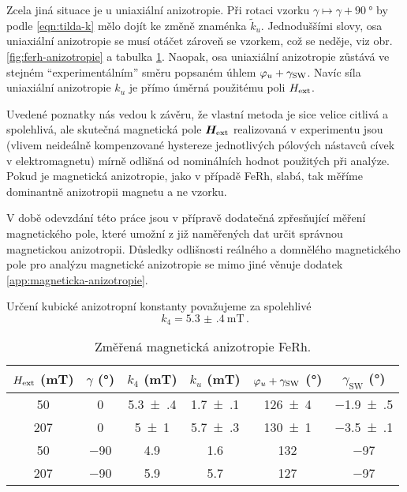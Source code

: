 Zcela jiná situace je u uniaxiální anizotropie.
Při rotaci vzorku $\gamma \mapsto\gamma+\SI{90}{\degree}$ by podle \eqref{eqn:tilda-k} mělo dojít ke změně znaménka $\tilde{k}_u$.
Jednoduššími slovy, osa uniaxiální anizotropie se musí otáčet zároveň se vzorkem, což se neděje, viz obr. \ref{fig:ferh-anizotropie} a tabulka \ref{tab:ferh-anizotropie}.
Naopak, osa uniaxiální anizotropie zůstává ve stejném ``experimentálním'' směru popsaném úhlem $\varphi_u+\gamma_\textrm{SW}$.
Navíc síla uniaxiální anizotropie $k_u$ je přímo úměrná použitému poli $H_\textrm{ext}$.

Uvedené poznatky nás vedou k závěru, že vlastní metoda je sice velice citlivá a spolehlivá, ale skutečná magnetická pole $\bm{H}_\textrm{ext}$ realizovaná v experimentu jsou (vlivem neideálně kompenzované hystereze jednotlivých pólových nástavců cívek v elektromagnetu) mírně odlišná od nominálních hodnot použitých při analýze.
Pokud je magnetická anizotropie, jako v případě FeRh, slabá, tak měříme dominantně anizotropii magnetu a ne vzorku.

V době odevzdání této práce jsou v přípravě dodatečná zpřesňující měření magnetického pole, které umožní z již naměřených dat určit správnou magnetickou anizotropii.
Důsledky odlišnosti reálného a domnělého magnetického pole pro analýzu magnetické anizotropie se mimo jiné věnuje dodatek \ref{app:magneticka-anizotropie}.

Určení kubické anizotropní konstanty považujeme za spolehlivé
\begin{equation}
    k_4=\SI{5.3(4)}{\milli\tesla} \,.
\end{equation}

\begin{table}[tp]
    \centering
    \begin{tabular}{cc|cccc}
        \toprule
        $H_\textrm{ext}$ (\si{\milli\tesla}) & $\gamma$ (\si{\degree}) & $k_4$ (\si{\milli\tesla}) & $k_u$ (\si{\milli\tesla}) & $\varphi_u+\gamma_\textrm{SW}$ (\si{\degree}) & $\gamma_\textrm{SW}$ (\si{\degree}) \\ \midrule[\heavyrulewidth]
        50 & 0 & \num{5.3(4)} & \num{1.7(1)} & \num{126(4)} & \num{-1.9(5)} \\
        207 & 0 & \num{5(1)} & \num{5.7(3)} & \num{130(1)} & \num{-3.5(1)} \\ \midrule[\heavyrulewidth]
        50 & \num{-90} & \num{4.9} & \num{1.6} & \num{132} & \num{-97} \\
        207 & \num{-90} & \num{5.9} & \num{5.7} & \num{127} & \num{-97} \\
        \bottomrule 
    \end{tabular} 
    \caption{Změřená magnetická anizotropie FeRh.}
    \label{tab:ferh-anizotropie}
\end{table}



